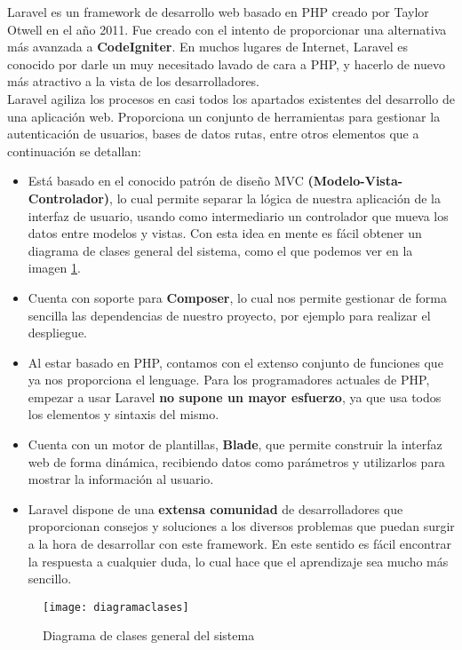 Laravel es un framework de desarrollo web basado en PHP creado por Taylor Otwell en el año 2011. Fue creado con el intento de proporcionar una alternativa más avanzada a \textbf{CodeIgniter}. En muchos lugares de Internet, Laravel es conocido por darle un muy necesitado lavado de cara a PHP, y hacerlo de nuevo más atractivo a la vista de los desarrolladores.\\

Laravel agiliza los procesos en casi todos los apartados existentes del desarrollo de una aplicación web. Proporciona un conjunto de herramientas para gestionar la autenticación de usuarios, bases de datos rutas, entre otros elementos que a continuación se detallan:

\begin{itemize}
    \item Está basado en el conocido patrón de diseño MVC \textbf{(Modelo-Vista-Controlador)}, lo cual permite separar la lógica de nuestra aplicación de la interfaz de usuario, usando como intermediario un controlador que mueva los datos entre modelos y vistas. Con esta idea en mente es fácil obtener un diagrama de clases general del sistema, como el que podemos ver en la imagen \ref{diagramaclases}.
    \item Cuenta con soporte para \textbf{Composer}, lo cual nos permite gestionar de forma sencilla las dependencias de nuestro proyecto, por ejemplo para realizar el despliegue.
    \item Al estar basado en PHP, contamos con el extenso conjunto de funciones que ya nos proporciona el lenguage. Para los programadores actuales de PHP, empezar a usar Laravel \textbf{no supone un mayor esfuerzo}, ya que usa todos los elementos y sintaxis del mismo.
    \item Cuenta con un motor de plantillas, \textbf{Blade}, que permite construir la interfaz web de forma dinámica, recibiendo datos como parámetros y utilizarlos para mostrar la información al usuario.
    \item Laravel dispone de una \textbf{extensa comunidad} de desarrolladores que proporcionan consejos y soluciones a los diversos problemas que puedan surgir a la hora de desarrollar con este framework. En este sentido es fácil encontrar la respuesta a cualquier duda, lo cual hace que el aprendizaje sea mucho más sencillo.
\end{itemize}

\begin{figure}
    \centering
    \texttt{[image: diagramaclases]}
    \caption{Diagrama de clases general del sistema}
    \label{diagramaclases}
\end{figure}

